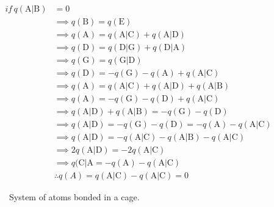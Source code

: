 \begin{align}
  if\, q(\mathrm{A}|\mathrm{B}) &= 0 \nonumber \\
    & \implies q(\mathrm{B}) = q(\mathrm{E}) \nonumber \\
    & \implies q(\mathrm{A}) = q(\mathrm{A}|\mathrm{C}) + q(\mathrm{A}|\mathrm{D}) \nonumber \\
    & \implies q(\mathrm{D}) = q(\mathrm{D}|\mathrm{G}) + q(\mathrm{D}|\mathrm{A}) \nonumber \\
    & \implies q(\mathrm{G}) = q(\mathrm{G}|\mathrm{D}) \nonumber \\
    & \implies q(\mathrm{D}) = -q(\mathrm{G}) -q(\mathrm{A}) + q(\mathrm{A}|\mathrm{C}) \nonumber \\
    & \implies q(\mathrm{A}) = q(\mathrm{A}|\mathrm{C}) + q(\mathrm{A}|\mathrm{D}) + q(\mathrm{A}|\mathrm{B})\nonumber \\
    & \implies q(\mathrm{A}) = -q(\mathrm{G}) - q(\mathrm{D}) + q(\mathrm{A}|\mathrm{C})\nonumber \\
    & \implies q(\mathrm{A}|\mathrm{D}) + q(\mathrm{A}|\mathrm{B}) = -q(\mathrm{G}) - q(\mathrm{D}) \nonumber \\
    & \implies q(\mathrm{A}|\mathrm{D}) = -q(\mathrm{G}) - q(\mathrm{D}) = -q(\mathrm{A}) -q(\mathrm{A}|\mathrm{C})\nonumber \\
    & \implies q(\mathrm{A}|\mathrm{D}) = -q(\mathrm{A}|\mathrm{C}) - q(\mathrm{A}|\mathrm{B}) -q(\mathrm{A}|\mathrm{C})\nonumber \\
    & \implies 2q(\mathrm{A}|\mathrm{D}) = -2q(\mathrm{A}|\mathrm{C}) \nonumber \\
    & \implies q(\mathrm{C}|\mathrm{A} = -q(\mathrm{A}) -q(\mathrm{A}|\mathrm{C}) \nonumber \\
    & \therefore q(A) = q(\mathrm{A}|\mathrm{C}) -q(\mathrm{A}|\mathrm{C}) = 0
\end{align}

\newpage

\vspace*{0.5cm}%
\begin{figure}[ht]
  \centering
  \scalebox{.4}{}
  \caption{System of atoms bonded in a cage.}
\end{figure}

